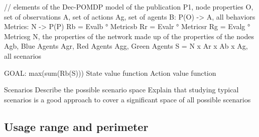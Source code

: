 \documentclass[conference]{IEEEtran}
\begin{document}
// elements of the Dec-POMDP model of the publication
P1, node properties
O, set of observations
A, set of actions
Ag, set of agents
B: P(O) -> A, all behaviors
Metrics: N -> P(P)
Rb = Evalb ° Metricsb
Rr = Evalr ° Metricsr
Rg = Evalg ° Metricsg
N, the properties of the network made up of the properties of the nodes
Agb, Blue Agents
Agr, Red Agents
Agg, Green Agents
S = N x Ar x Ab x Ag, all scenarios

GOAL: max(sum(Rb(S)))
State value function
Action value function

Scenarios
Describe the possible scenario space
Explain that studying typical scenarios is a good approach to cover a significant space of all possible scenarios


\subsection{Usage range and perimeter}
\end{document}
